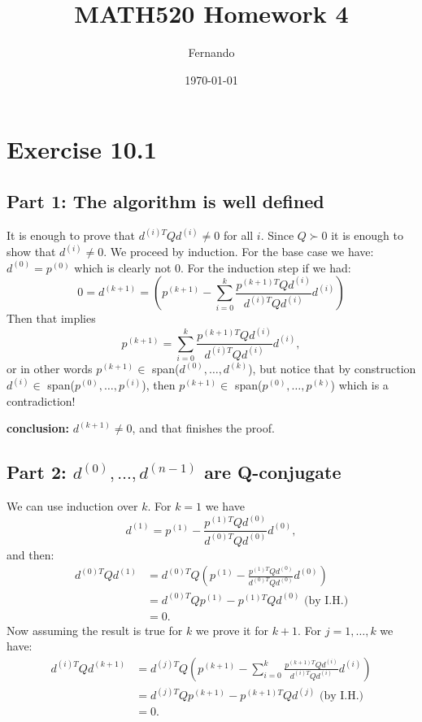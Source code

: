 \documentclass{article}
\begin{document}
\title{MATH520 Homework 4}
\author{Fernando}
\date{\today}
\maketitle

\section*{Exercise 10.1}
\subsection*{Part 1: The algorithm is well defined}
It is enough to prove that $d^{(i)T}Qd^{(i)}\neq 0$ for all $i$. Since $Q\succ
0$ it is enough to show that $d^{(i)}\neq 0$.
We proceed by induction. For the base case we have: $d^{(0)}=p^{(0)}$ which is
clearly not 0. For the induction step if we had:
\[
0=d^{(k+1)}=
\left(p^{(k+1)}-\sum_{i=0}^k\frac{p^{(k+1)T}Qd^{(i)}}{d^{(i)T}Qd^{(i)}}d^{(i)}\right)
\]
Then that implies
\[
p^{(k+1)}=\sum_{i=0}^k\frac{p^{(k+1)T}Qd^{(i)}}{d^{(i)T}Qd^{(i)}}d^{(i)},
\]
or in other words $p^{(k+1)}\in$ span($d^{(0)},\dots,d^{(k)}$), but notice that
by construction $d^{(i)}\in$ span($p^{(0)},\dots,p^{(i)}$), then $p^{(k+1)}\in$
span($p^{(0)},\dots,p^{(k)}$) which is a contradiction!

\textbf{conclusion:} $d^{(k+1)}\neq 0$, and that finishes the proof.
\subsection*{Part 2: $d^{(0)},\dots,d^{(n-1)}$ are Q-conjugate}
We can use induction over $k$. For $k=1$ we have
\[
	d^{(1)}=p^{(1)}-\frac{p^{(1)T}Qd^{(0)}}{d^{(0)T}Qd^{(0)}}d^{(0)},
\]
and then:
\begin{align*}
	d^{(0)T}Qd^{(1)}&=
	d^{(0)T}Q\left(p^{(1)}-\frac{p^{(1)T}Qd^{(0)}}{d^{(0)T}Qd^{(0)}}d^{(0)}\right)\\
	&=
	d^{(0)T}Qp^{(1)}-p^{(1)T}Qd^{(0)} \text{ (by I.H.)}\\
	&=0.
\end{align*}
Now assuming the result is true for $k$ we prove it for $k+1$. For
$j=1,\dots,k$ we have:
\begin{align*}
	d^{(i)T}Qd^{(k+1)}&=
	d^{(j)T}Q\left(p^{(k+1)}-\sum_{i=0}^k\frac{p^{(k+1)T}Qd^{(i)}}{d^{(i)T}Qd^{(i)}}d^{(i)}\right)\\
	&=
	d^{(j)T}Qp^{(k+1)}-p^{(k+1)T}Qd^{(j)} \text{ (by I.H.)}\\
	&=0.
\end{align*}
\end{document}
